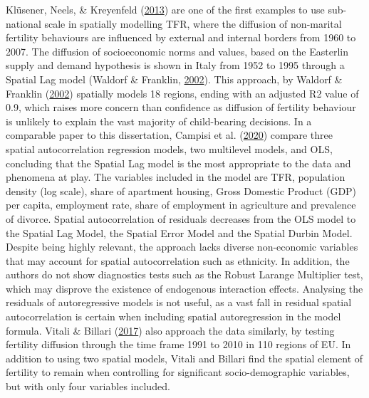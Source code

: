 \documentclass[12pt,twoside]{reedthesis}
\begin{document}
Klüsener, Neels, \& Kreyenfeld (\protect\hyperlink{ref-klusener2013}{2013}) are one of the first examples to use sub-national scale in spatially modelling TFR, where the diffusion of non-marital fertility behaviours are influenced by external and internal borders from 1960 to 2007. The diffusion of socioeconomic norms and values, based on the Easterlin supply and demand hypothesis is shown in Italy from 1952 to 1995 through a Spatial Lag model (Waldorf \& Franklin, \protect\hyperlink{ref-waldorf2002}{2002}). This approach, by Waldorf \& Franklin (\protect\hyperlink{ref-waldorf2002}{2002}) spatially models 18 regions, ending with an adjusted R2 value of 0.9, which raises more concern than confidence as diffusion of fertility behaviour is unlikely to explain the vast majority of child-bearing decisions. In a comparable paper to this dissertation, Campisi et al. (\protect\hyperlink{ref-campisi2020}{2020}) compare three spatial autocorrelation regression models, two multilevel models, and OLS, concluding that the Spatial Lag model is the most appropriate to the data and phenomena at play. The variables included in the model are TFR, population density (log scale), share of apartment housing, Gross Domestic Product (GDP) per capita, employment rate, share of employment in agriculture and prevalence of divorce. Spatial autocorrelation of residuals decreases from the OLS model to the Spatial Lag Model, the Spatial Error Model and the Spatial Durbin Model. Despite being highly relevant, the approach lacks diverse non-economic variables that may account for spatial autocorrelation such as ethnicity. In addition, the authors do not show diagnostics tests such as the Robust Larange Multiplier test, which may disprove the existence of endogenous interaction effects. Analysing the residuals of autoregressive models is not useful, as a vast fall in residual spatial autocorrelation is certain when including spatial autoregression in the model formula. Vitali \& Billari (\protect\hyperlink{ref-vitali2017}{2017}) also approach the data similarly, by testing fertility diffusion through the time frame 1991 to 2010 in 110 regions of EU. In addition to using two spatial models, Vitali and Billari find the spatial element of fertility to remain when controlling for significant socio-demographic variables, but with only four variables included.
\end{document}
